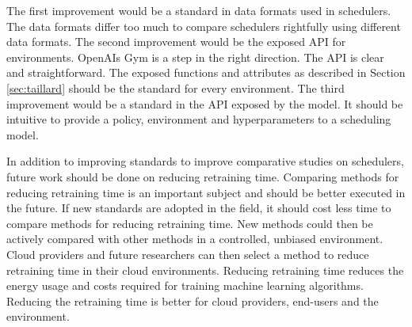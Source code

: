 The first improvement would be a standard in data formats used in \rlbased
schedulers. The data formats differ too much to compare \rlbased schedulers
rightfully using different data formats. The second improvement would be the
exposed API for environments. OpenAIs Gym is a step in the right direction.
The API is clear and straightforward. The exposed functions and attributes as
described in Section \ref{sec:taillard} should be the standard for every \jss
environment. The third improvement would be a standard in the API exposed by
the model. It should be intuitive to provide a policy, environment and
hyperparameters to a \rlbased scheduling model.

In addition to improving standards to improve comparative studies on \rlbased
schedulers, future work should be done on reducing retraining time. Comparing
methods for reducing retraining time is an important subject and should be
better executed in the future. If new standards are adopted in the field, it
should cost less time to compare methods for reducing
retraining time. New methods could then be actively compared with other
methods in a controlled, unbiased environment. Cloud providers and future
researchers can then select a method to reduce retraining time in their cloud
environments. Reducing retraining time reduces the energy usage and costs
required for training machine learning algorithms. Reducing the retraining
time is better for cloud providers, end-users and the environment.
